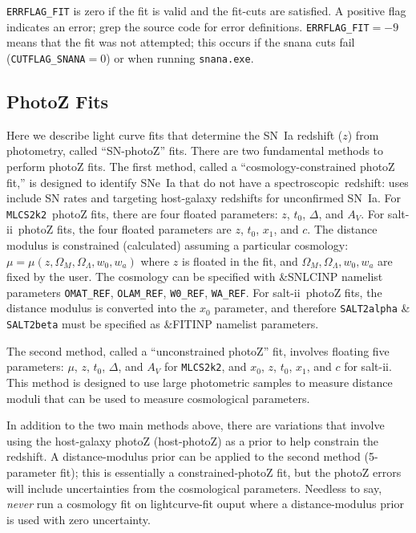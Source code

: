 \documentclass[12pt]{article}
\newcommand{\mlcs}{{\tt MLCS2k2}}
\newcommand{\SALTII}{{\sc salt-ii}}
\newcommand{\spec}{spectroscopic}
\newcommand{\OM}{\Omega_M}
\newcommand{\OL}{\Omega_{\Lambda}}
\begin{document}
{\tt ERRFLAG\_FIT} is zero if the fit is valid and the
fit-cuts are satisfied. A positive flag indicates an
error; grep the source code for error definitions.
{\tt ERRFLAG\_FIT}$=-9$ means that the fit was not
attempted; this occurs if the snana cuts fail
({\tt CUTFLAG\_SNANA}$=0$) or when running {\tt snana.exe}.

   \clearpage
   \subsection{PhotoZ Fits}
   \label{subsec:photoz}

Here we describe light curve fits that determine the
SN~Ia redshift ($z$) from photometry, called ``SN-photoZ'' fits.
There are two fundamental methods to perform photoZ fits.
The first method, called a ``cosmology-constrained photoZ fit,'' 
is designed to identify SNe~Ia that do not have
a \spec\ redshift: uses include SN rates and targeting
host-galaxy redshifts for unconfirmed SN~Ia.
For \mlcs\ photoZ fits, there are four floated
parameters: $z$, $t_0$, $\Delta$, and $A_V$.
For \SALTII\ photoZ fits, the four floated parameters are
$z$, $t_0$, $x_1$, and $c$.
%
The distance modulus is constrained (calculated)
assuming a particular cosmology: $\mu = \mu(z,\OM,\OL,w_0,w_a)$
where $z$ is floated in the fit, and $\OM,\OL,w_0,w_a$ are
fixed by the user.  The cosmology can be specified
with \&SNLCINP namelist parameters
{\tt OMAT\_REF}, {\tt OLAM\_REF}, {\tt W0\_REF}, {\tt WA\_REF}.
For \SALTII\ photoZ fits, the distance modulus is converted
into the $x_0$ parameter, and therefore 
{\tt SALT2alpha} \& {\tt SALT2beta} must be specified
as \&FITINP namelist parameters.


The second method, called a ``unconstrained photoZ'' fit,
involves floating five parameters:
$\mu$, $z$, $t_0$, $\Delta$, and $A_V$ for \mlcs, and
$x_0$, $z$, $t_0$, $x_1$, and $c$ for \SALTII.
This method is designed to use large photometric samples
to measure distance moduli that can be used to measure
cosmological parameters. 


In addition to the two main methods above, there are
variations that involve using the host-galaxy photoZ
(host-photoZ) as a prior to help constrain the redshift.
A distance-modulus prior can be applied to the second
method (5-parameter fit); this is essentially a
constrained-photoZ fit, but the photoZ errors will include 
uncertainties from the cosmological parameters.
Needless to say, {\it never} run a cosmology fit
on lightcurve-fit ouput where a distance-modulus prior is used with zero uncertainty.
\end{document}
